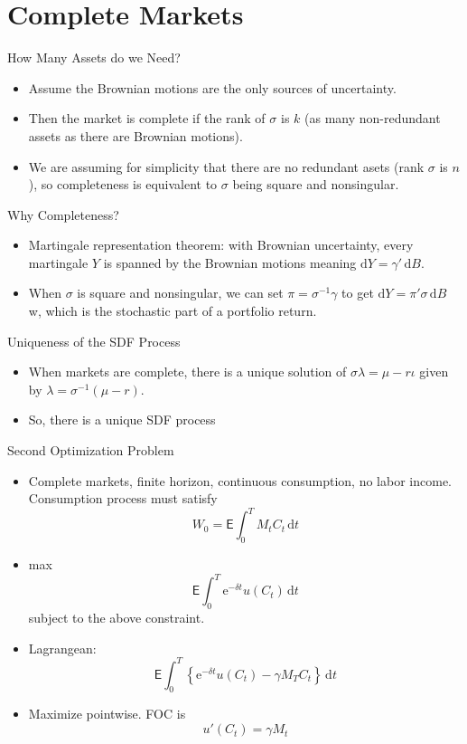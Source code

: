\documentclass[10pt]{beamer}
\newcommand{\bi}{\begin{itemize}}
\newcommand{\ei}{\end{itemize}}
\newcommand{\im}{\item}
\newcommand{\D}{\mathrm{d}}
\newcommand{\E}{\mathrm{e}}
\newcommand{\mye}{\ensuremath{\mathsf{E}}}
\begin{document}
\section{Complete Markets}

\begin{frame}{How Many Assets do we Need?}
\bi 
\im Assume the Brownian motions are the only sources of uncertainty.
\im Then the market is complete if the rank of $\sigma$ is $k$ (as many non-redundant assets as there are Brownian motions).
\im We are assuming for simplicity that there are no redundant asets (rank $\sigma$ is $n$), so completeness is equivalent to $\sigma$ being square and nonsingular.
\ei 
\end{frame}

\begin{frame}{Why Completeness?}
    \bi
\im Martingale representation theorem: with Brownian uncertainty, every martingale $Y$ is spanned by the Brownian motions meaning 
$\D Y = \gamma'\,\D B$.
\im When $\sigma$ is square and nonsingular, we can set $\pi = \sigma^{-1}\gamma$ to get
$\D Y = \pi'\sigma\,\D B$ w, which is the stochastic part of a portfolio return.
\ei 
\end{frame}

\begin{frame}{Uniqueness of the SDF Process}
    \bi 
    \im When markets are complete, there is a unique solution of $\sigma \lambda = \mu -r\iota$ given by $\lambda = \sigma^{-1}(\mu - r)$.
    \im So, there is a unique SDF process
    \ei
\end{frame}

\begin{frame}{Second Optimization Problem}
    \bi 
    \im Complete markets, finite horizon, continuous consumption, no labor income.  Consumption process must satisfy
    $$W_0 = \mye \int_0^T M_t C_t\,\D t$$
    \im max 
    $$\mye \int_0^T \E^{-\delta t}u(C_t)\,\D t$$
    subject to the above constraint.
    \im Lagrangean:
    $$\mye \int_0^T \left\{\E^{-\delta t}u(C_t) - \gamma M_T C_t \right\}\,\D t$$
    \im Maximize pointwise.  FOC is 
    $$u'(C_t) = \gamma M_t$$
    \ei
\end{frame}
\end{document}

